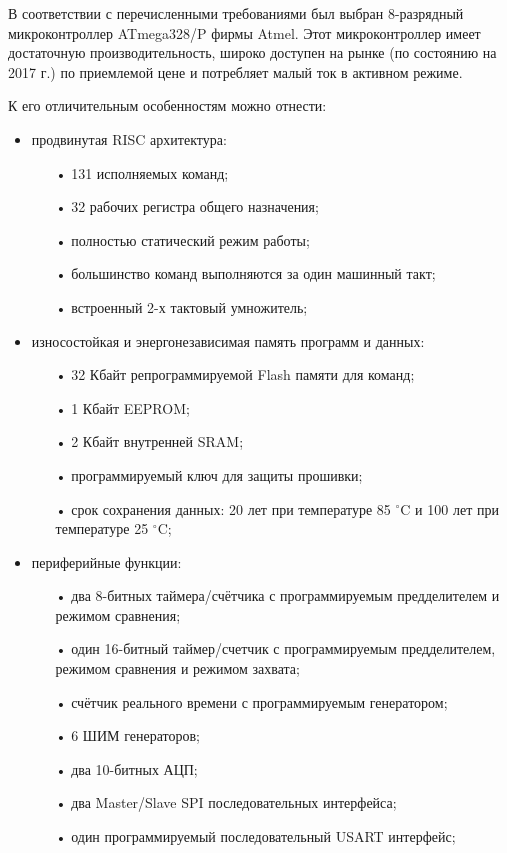 В соответствии с перечисленными требованиями был выбран 8-разрядный микроконтроллер ATmega328/P фирмы Atmel. Этот микроконтроллер имеет достаточную производительность, широко доступен на рынке (по состоянию на 2017 г.) по приемлемой цене и потребляет малый ток в активном режиме.

К его отличительным особенностям можно отнести\cite{atmegainfo}:
\begin{itemize}
	\item продвинутая RISC архитектура:
	\begin{itemize}
		\item[•] 131 исполняемых команд;
		\item[•] 32 рабочих регистра общего назначения;
		\item[•] полностью статический режим работы;
		\item[•] большинство команд выполняются за один машинный такт;
		\item[•] встроенный 2-х тактовый умножитель;
	\end{itemize}
	\item износостойкая и энергонезависимая память программ и данных:
	\begin{itemize}
		\item[•] 32 Кбайт репрограммируемой Flash памяти для команд;
		\item[•] 1 Кбайт EEPROM;
		\item[•] 2 Кбайт внутренней SRAM;
		\item[•] программируемый ключ для защиты прошивки;
		\item[•] срок сохранения данных: 20 лет при температуре 85 $^{\circ}$C и 100 лет при температуре 25 $^{\circ}$C;
	\end{itemize}
	\item периферийные функции:
	\begin{itemize}
		\item[•] два 8-битных таймера/счётчика с программируемым предделителем и режимом сравнения;
		\item[•] один 16-битный таймер/счетчик с программируемым предделителем, режимом сравнения и режимом захвата;
		\item[•] счётчик реального времени с программируемым генератором;
		\item[•] 6 ШИМ генераторов;
		\item[•] два 10-битных АЦП;
		\item[•] два Master/Slave SPI последовательных интерфейса;
		\item[•] один программируемый последовательный USART интерфейс;

\end{itemize}
\end{itemize}
